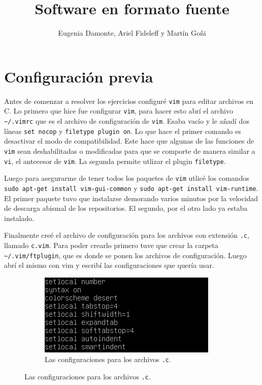 \documentclass[11pt]{article}
\title{\Huge Software en formato fuente}
\author{Eugenia Damonte, Ariel Fideleff y Mart\'in Go\~ni}
\date{}
\begin{document}
	\maketitle
	\newpage
	\tableofcontents
	\newpage
	
	
	\section{Configuraci\'on previa}
		Antes de comenzar a resolver los ejercicios configur\'e \texttt{vim} para editar archivos en C. Lo primero que hice fue configurar \texttt{vim}, para hacer esto abr\'i el archivo \texttt{\textasciitilde/.vimrc} que es el archivo de configuraci\'on de \texttt{vim}. Esaba vac\'io y le a\~nad\'i dos l\'ineas \texttt{set nocop} y \texttt{filetype plugin on}. Lo que hace el primer comando es desactivar el modo de compatibilidad. Este hace que algunas de las funciones de \texttt{vim} sean deshabilitadas o modificadas para que se comporte de manera similar a \texttt{vi}, el antecesor de \texttt{vim}. La segunda permite utlizar el plugin \texttt{filetype}.
		
		Luego para asegurarme de tener todos los paquetes de \texttt{vim} utlic\'e los comandos \texttt{sudo apt-get install vim-gui-common} y \texttt{sudo apt-get install vim-runtime}. El primer paquete tuvo que instalarse demorando varios minutos por la velocidad de descarga abismal de los repositorios. El segundo, por el otro lado ya estaba instalado.
		
		Finalmente cre\'e el archivo de configuraci\'on para los archivos con extensi\'on \texttt{.c}, llamado \texttt{c.vim}. Para poder crearlo primero tuve que crear la carpeta \texttt{\textasciitilde/.vim/ftplugin}, que es donde se ponen los archivos de configuraci\'on. Luego abr\'i el mismo con vim y escrib\'i las configuraciones que quer\'ia usar.
		\begin{figure}[H]
			\centering
			\begin{subfigure}[b!]{0.7\linewidth}
				\includegraphics[width=\linewidth]{Images/Preamble/Preamble.PNG}
				\caption*{Las configuraciones para los archivos \texttt{.c}.}
			\end{subfigure}
		\end{figure}




















\end{document}
